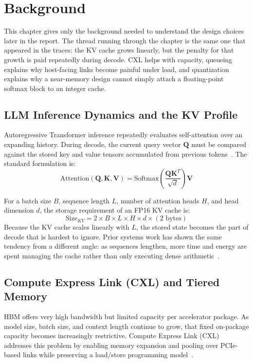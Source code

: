 \chapter{Background}
\label{ch:background}

This chapter gives only the background needed to understand the design choices later in the report. The thread running through the chapter is the same one that appeared in the traces: the KV cache grows linearly, but the penalty for that growth is paid repeatedly during decode. CXL helps with capacity, queueing explains why host-facing links become painful under load, and quantization explains why a near-memory design cannot simply attach a floating-point softmax block to an integer cache.

\section{LLM Inference Dynamics and the KV Profile}

Autoregressive Transformer inference repeatedly evaluates self-attention over an expanding history. During decode, the current query vector $\mathbf{Q}$ must be compared against the stored key and value tensors accumulated from previous tokens~\cite{flashattn}. The standard formulation is:
\begin{equation}
\label{eq:attn}
\text{Attention}(\mathbf{Q}, \mathbf{K}, \mathbf{V}) = \text{Softmax}\left( \frac{\mathbf{Q} \mathbf{K}^T}{\sqrt{d}} \right) \mathbf{V}
\end{equation}

For a batch size $B$, sequence length $L$, number of attention heads $H$, and head dimension $d$, the storage requirement of an FP16 KV cache is:
\begin{equation}
    \text{Size}_{KV} = 2 \times B \times L \times H \times d \times (\text{2 bytes})
\end{equation}
Because the KV cache scales linearly with $L$, the stored state becomes the part of decode that is hardest to ignore. Prior systems work has shown the same tendency from a different angle: as sequences lengthen, more time and energy are spent managing the cache rather than only executing dense arithmetic~\cite{infinigen}.

\section{Compute Express Link (CXL) and Tiered Memory}

HBM offers very high bandwidth but limited capacity per accelerator package. As model size, batch size, and context length continue to grow, that fixed on-package capacity becomes increasingly restrictive. Compute Express Link (CXL) addresses this problem by enabling memory expansion and pooling over PCIe-based links while preserving a load/store programming model~\cite{cxl_standard}.

